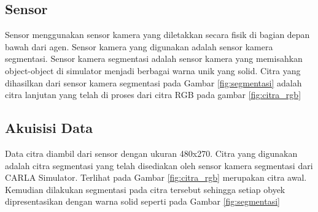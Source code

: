 \documentclass[conference]{IEEEtran}
\begin{document}
\subsection{Sensor}
\label{sec:sensor}
Sensor menggunakan sensor kamera yang diletakkan secara fisik di bagian depan bawah dari agen. Sensor kamera yang digunakan adalah sensor kamera segmentasi. Sensor kamera segmentasi adalah sensor kamera yang memisahkan object-object di simulator menjadi berbagai warna unik yang solid. Citra yang dihasilkan dari sensor kamera segmentasi pada Gambar \ref{fig:segmentasi} adalah citra lanjutan yang telah di proses dari citra RGB pada gambar \ref{fig:citra_rgb}


\subsection{Akuisisi Data}
\label{sec:akuisisi_data}
Data citra diambil dari sensor dengan ukuran 480x270. Citra yang digunakan adalah citra segmentasi yang telah disediakan oleh sensor kamera segmentasi dari CARLA Simulator. Terlihat pada Gambar \ref{fig:citra_rgb} merupakan citra awal. Kemudian dilakukan segmentasi pada citra tersebut sehingga setiap obyek dipresentasikan dengan warna solid seperti pada Gambar \ref{fig:segmentasi}
\end{document}
